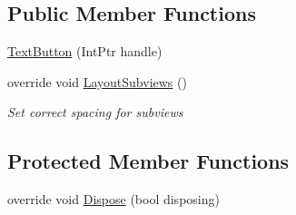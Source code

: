 \subsection*{Public Member Functions}
\begin{DoxyCompactItemize}
\item 
\hyperlink{class_field_service_1_1i_o_s_1_1_text_button_abd6f82daefac52ef41adda55f1c74440}{Text\+Button} (Int\+Ptr handle)
\item 
override void \hyperlink{class_field_service_1_1i_o_s_1_1_text_button_a215f013f0f3d3321e58a87fddfc1a590}{Layout\+Subviews} ()
\begin{DoxyCompactList}\small\item\em Set correct spacing for subviews \end{DoxyCompactList}\end{DoxyCompactItemize}
\subsection*{Protected Member Functions}
\begin{DoxyCompactItemize}
\item 
override void \hyperlink{class_field_service_1_1i_o_s_1_1_text_button_ae314b69eb5799c37d8351bd78534a3e3}{Dispose} (bool disposing)
\end{DoxyCompactItemize}
